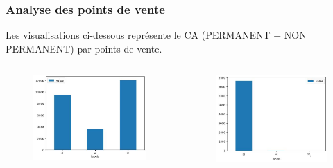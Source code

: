 \documentclass{beamer}
\begin{document}
    \begin{frame}
        \tiny
        \frametitle{Analyse des points de vente}

        Les visualisations ci-dessous représente le CA (PERMANENT + NON PERMANENT) par points de vente.\par

        
                    \begin{columns}
                        \centering
                        \begin{figure}[h]
                            \centering
                            \includegraphics[width=1\textwidth]{assets/ca_0.jpg}
                        \end{figure}
                        \centering
                        \begin{figure}[h]
                            \centering
                            \includegraphics[width=1\textwidth]{assets/ca_1.jpg}
                        \end{figure}
                            \end{columns}
        

\end{frame}
\end{document}

